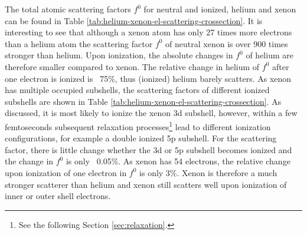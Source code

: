 The total atomic scattering factors $f^{0}$ for neutral and ionized, helium and xenon can be found in Table \ref{tab:helium-xenon-el-scattering-crossection}. It is interesting to see that although a xenon atom has only 27 times more electrons than a helium atom the scattering factor $f^{0}$ of neutral xenon is over 900 times stronger than helium. Upon ionization, the absolute changes in $f^{0}$ of helium are therefore smaller compared to xenon. The relative change in helium of $f^{0}$ after one electron is ionized is ~75\%, thus (ionized) helium barely scatters. As xenon has multiple occupied subshells, the scattering factors of different ionized subshells are shown in Table \ref{tab:helium-xenon-el-scattering-crossection}. As discussed, it is most likely to ionize the xenon 3d subshell, however, within a few femtoseconds subsequent relaxation processes\footnote{See the following Section \ref{sec:relaxation}.} lead to different ionization configurations, for example a double ionized 5p subshell. For the scattering factor, there is little change whether the 3d or 5p subshell becomes ionized and the change in $f^{0}$ is only ~0.05\%. As xenon has 54 electrons, the relative change upon ionization of one electron in $f^{0}$ is only 3\%. Xenon is therefore a much stronger scatterer than helium and xenon still scatters well upon ionization of inner or outer shell electrons.  
